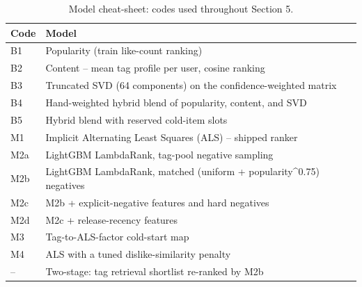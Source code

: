 \documentclass[conference]{IEEEtran}
\begin{document}
\begin{table}[H]

\caption{Model cheat-sheet: codes used throughout Section 5.}

\label{tab:3}

\centering

\begin{tabular}{@{}ll@{}}

\toprule

Code & Model \\

\midrule

B1 & Popularity (train like-count ranking) \\

B2 & Content -- mean tag profile per user, cosine ranking \\

B3 & Truncated SVD (64 components) on the confidence-weighted matrix \\

B4 & Hand-weighted hybrid blend of popularity, content, and SVD \\

B5 & Hybrid blend with reserved cold-item slots \\

M1 & Implicit Alternating Least Squares (ALS) -- shipped ranker \\

M2a & LightGBM LambdaRank, tag-pool negative sampling \\

M2b & LightGBM LambdaRank, matched (uniform + popularity\textasciicircum{}0.75) negatives \\

M2c & M2b + explicit-negative features and hard negatives \\

M2d & M2c + release-recency features \\

M3 & Tag-to-ALS-factor cold-start map \\

M4 & ALS with a tuned dislike-similarity penalty \\

-- & Two-stage: tag retrieval shortlist re-ranked by M2b \\

\bottomrule

\end{tabular}

\end{table}
\end{document}
